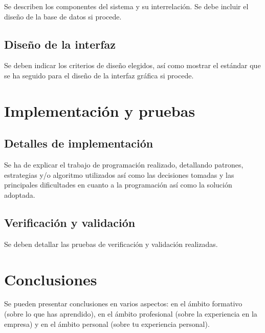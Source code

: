 \documentclass[pdftex,11pt,a4paper]{book}
\begin{document}
Se describen los componentes del sistema y su interrelación. Se debe incluir el diseño de la base de datos si procede.

\section{Diseño de la interfaz}

Se deben indicar los criterios de diseño elegidos, así como mostrar el estándar que se ha seguido para el diseño de la interfaz gráfica si procede.



\chapter{Implementación y pruebas}

\section{Detalles de implementación}

Se ha de explicar el trabajo de programación realizado, detallando patrones, estrategias y/o algoritmo utilizados así como las decisiones tomadas y las principales dificultades en cuanto a la programación así como la solución adoptada. 

\section{Verificación y validación}

Se deben detallar las pruebas de verificación y validación realizadas.



\chapter{Conclusiones}
Se pueden presentar conclusiones en varios aspectos: en el ámbito formativo (sobre lo que has aprendido), en el ámbito profesional (sobre la experiencia en la empresa) y en el ámbito personal (sobre tu experiencia personal).





\end{document}
